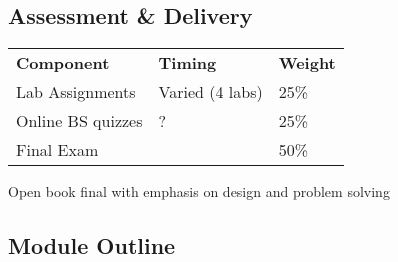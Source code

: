 \documentclass[12pt]{article}
\begin{document}

\subsection{Assessment \& Delivery}
    \begin{tabular}{ l l l }
        \textbf{Component} & \textbf{Timing} & \textbf{Weight} \\
        Lab Assignments & Varied (4 labs) & 25\% \\
        Online BS quizzes & ? & 25\% \\
        Final Exam & & 50\%
    \end{tabular}

Open book final with emphasis on design and problem solving

\subsection{Module Outline}
\end{document}
